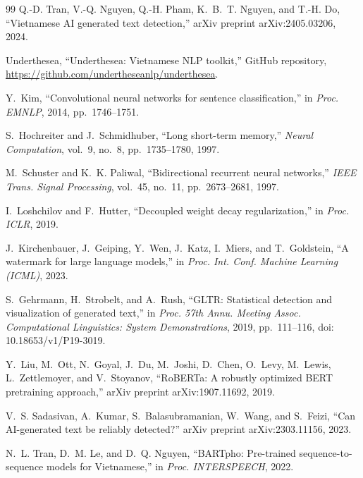 \documentclass[conference,a4paper]{IEEEtran}
\begin{document}
\begin{thebibliography}{99}
Q.-D. Tran, V.-Q. Nguyen, Q.-H. Pham, K.~B.~T. Nguyen, and T.-H. Do, ``Vietnamese AI generated text detection,'' arXiv preprint arXiv:2405.03206, 2024.

Underthesea, ``Underthesea: Vietnamese NLP toolkit,'' GitHub repository, \url{https://github.com/undertheseanlp/underthesea}.

Y.~Kim, ``Convolutional neural networks for sentence classification,'' in \emph{Proc. EMNLP}, 2014, pp.~1746--1751.

S.~Hochreiter and J.~Schmidhuber, ``Long short-term memory,'' \emph{Neural Computation}, vol.~9, no.~8, pp.~1735--1780, 1997.

M.~Schuster and K.~K. Paliwal, ``Bidirectional recurrent neural networks,'' \emph{IEEE Trans. Signal Processing}, vol.~45, no.~11, pp.~2673--2681, 1997.

I.~Loshchilov and F.~Hutter, ``Decoupled weight decay regularization,'' in \emph{Proc. ICLR}, 2019.

J.~Kirchenbauer, J.~Geiping, Y.~Wen, J.~Katz, I.~Miers, and T.~Goldstein, ``A watermark for large language models,'' in \emph{Proc. Int. Conf. Machine Learning (ICML)}, 2023.

S.~Gehrmann, H.~Strobelt, and A.~Rush, ``GLTR: Statistical detection and visualization of generated text,'' in \emph{Proc. 57th Annu. Meeting Assoc. Computational Linguistics: System Demonstrations}, 2019, pp.~111--116, doi: 10.18653/v1/P19-3019.

Y.~Liu, M.~Ott, N.~Goyal, J.~Du, M.~Joshi, D.~Chen, O.~Levy, M.~Lewis, L.~Zettlemoyer, and V.~Stoyanov, ``RoBERTa: A robustly optimized BERT pretraining approach,'' arXiv preprint arXiv:1907.11692, 2019.

V.~S. Sadasivan, A.~Kumar, S.~Balasubramanian, W.~Wang, and S.~Feizi, ``Can AI-generated text be reliably detected?'' arXiv preprint arXiv:2303.11156, 2023.

N.~L. Tran, D.~M. Le, and D.~Q. Nguyen, ``BARTpho: Pre-trained sequence-to-sequence models for Vietnamese,'' in \emph{Proc. INTERSPEECH}, 2022.

\end{thebibliography}
\end{document}
